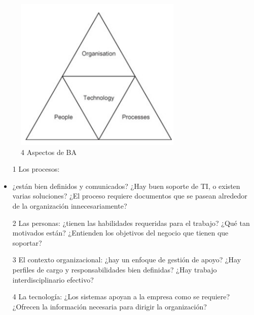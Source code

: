\documentclass[twoside,twocolumn]{article}
\begin{document}
\begin{figure}[h!]
	\centering
	\includegraphics[scale=0.45]{Image/1.PNG}
	\caption{4 Aspectos de BA}
	\label{fig:Csha3}
\end{figure}

\begin{itemize}
\item[1]Los procesos:  
\newline
\item ¿están bien definidos y comunicados? ¿Hay buen soporte de TI, o existen varias soluciones? ¿El proceso requiere documentos que se pasean alrededor de la organización innecesariamente?
\newline
\item[2]Las personas: 
\newline
\newline
¿tienen las habilidades requeridas para el trabajo? ¿Qué tan motivados están? ¿Entienden los objetivos del negocio que tienen que soportar? 
\newline
\item[3]El contexto organizacional: 
\newline
\newline
 ¿hay un enfoque de gestión de apoyo? ¿Hay perfiles de cargo y responsabilidades bien definidas? ¿Hay trabajo interdisciplinario efectivo? 
\newline
\item[4]La tecnología: 
\newline
\newline
¿Los sistemas apoyan a la empresa como se requiere? ¿Ofrecen la información necesaria para dirigir la organización? 
\newline

\end{itemize}
\end{document}
